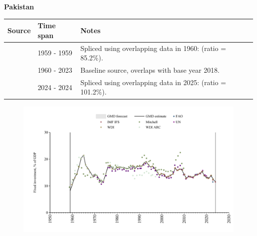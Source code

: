 \documentclass[12pt,a4paper,landscape]{article}
\begin{document}
\begin{adjustbox}{max totalsize={\paperwidth}{\paperheight},center}
\begin{minipage}[t][\textheight][t]{\textwidth}
\vspace*{0.5cm}
{}
\begin{center}
{\Large\bfseries Pakistan}
\end{center}
\vspace{0.5cm}
\begin{table}[H]
\centering
\small
\begin{tabular}{|l|l|l|}
\hline
\textbf{Source} & \textbf{Time span} & \textbf{Notes} \\
\hline
\rowcolor{white}\cite{Mitchell}& 1959 - 1959 &Spliced using overlapping data in 1960: (ratio = 85.2\%).\\
\rowcolor{lightgray}\cite{WDI}& 1960 - 2023 &Baseline source, overlaps with base year 2018.\\
\rowcolor{white}\cite{IMF_IFS}& 2024 - 2024 &Spliced using overlapping data in 2025: (ratio = 101.2\%).\\
\hline
\end{tabular}
\end{table}
\begin{figure}[H]
\centering
\includegraphics[width=\textwidth,height=0.6\textheight,keepaspectratio]{graphs/PAK_finv_GDP.pdf}
\end{figure}
\end{minipage}
\end{adjustbox}
\end{document}
